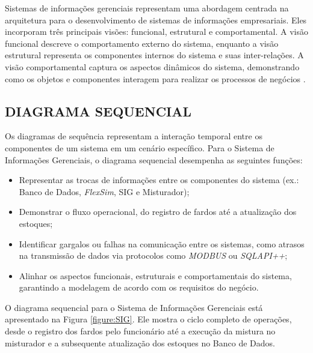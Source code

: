 \documentclass[
    12pt,                %
    openright,           %
    oneside,             %
    a4paper,             %
    english,             %
    spanish,             %
    brazil               %
]{ufscar}
\begin{document}
Sistemas de informações gerenciais representam uma abordagem centrada na arquitetura para o desenvolvimento de sistemas de informações empresariais. Eles incorporam três principais visões: funcional, estrutural e comportamental. A visão funcional descreve o comportamento externo do sistema, enquanto a visão estrutural representa os componentes internos do sistema e suas inter-relações. A visão comportamental captura os aspectos dinâmicos do sistema, demonstrando como os objetos e componentes interagem para realizar os processos de negócios \cite{dennis_systems_2009}.

\subsection{DIAGRAMA SEQUENCIAL}

Os diagramas de sequência representam a interação temporal entre os componentes de um sistema em um cenário específico. Para o Sistema de Informações Gerenciais, o diagrama sequencial desempenha as seguintes funções:

\begin{itemize}
    \item Representar as trocas de informações entre os componentes do sistema (ex.: Banco de Dados, \textit{FlexSim}, SIG e Misturador);
    \item Demonstrar o fluxo operacional, do registro de fardos até a atualização dos estoques;
    \item Identificar gargalos ou falhas na comunicação entre os sistemas, como atrasos na transmissão de dados via protocolos como \textit{MODBUS} ou \textit{SQLAPI++};
    \item Alinhar os aspectos funcionais, estruturais e comportamentais do sistema, garantindo a modelagem de acordo com os requisitos do negócio.
\end{itemize}

O diagrama sequencial para o Sistema de Informações Gerenciais está apresentado na Figura \ref{figure:SIG}. Ele mostra o ciclo completo de operações, desde o registro dos fardos pelo funcionário até a execução da mistura no misturador e a subsequente atualização dos estoques no Banco de Dados.

\end{document}
